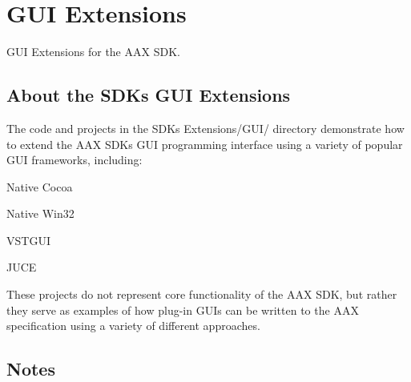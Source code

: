 \hypertarget{a00838}{}\section{G\+UI Extensions}
\label{a00838}
G\+UI Extensions for the A\+AX S\+DK. 

\hypertarget{a00838_about}{}\subsection{About the S\+D\+K\textquotesingle{}s G\+U\+I Extensions}\label{a00838_about}
The code and projects in the S\+DK\textquotesingle{}s Extensions/\+G\+U\+I/ directory demonstrate how to extend the A\+AX S\+DK\textquotesingle{}s G\+UI programming interface using a variety of popular G\+UI frameworks, including\+:


\begin{DoxyItemize}
\item Native Cocoa
\item Native Win32
\item V\+S\+T\+G\+UI
\item J\+U\+CE
\end{DoxyItemize}

These projects do not represent core functionality of the A\+AX S\+DK, but rather they serve as examples of how plug-\/in G\+U\+Is can be written to the A\+AX specification using a variety of different approaches.\hypertarget{a00838_notes}{}\subsection{Notes}\label{a00838_notes}

